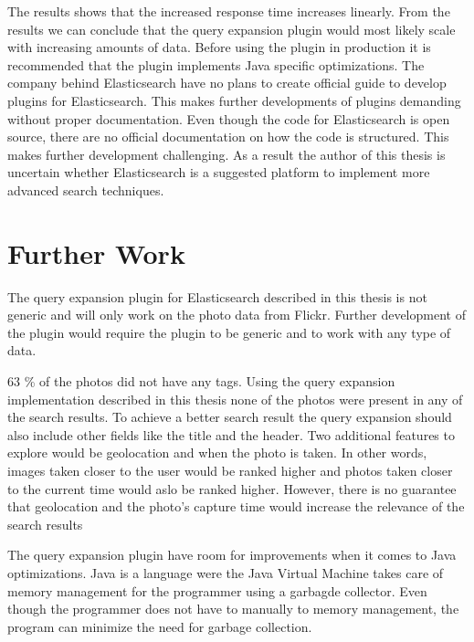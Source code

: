 The results shows that the increased response time increases linearly.
From the results we can conclude that the query expansion plugin would most likely scale with increasing amounts of data.
Before using the plugin in production it is recommended that the plugin implements Java specific optimizations.
The company behind Elasticsearch have no plans to create official guide to develop plugins for Elasticsearch.
This makes further developments of plugins demanding without proper documentation.
Even though the code for Elasticsearch is open source,
there are no official documentation on how the code is structured.
This makes further development challenging.
As a result the author of this thesis is uncertain whether Elasticsearch is a suggested platform to implement more advanced search techniques.

\section{Further Work}
The query expansion plugin for Elasticsearch described in this thesis is not generic and will only work on the photo data from Flickr.
Further development of the plugin would require the plugin to be generic and to work with any type of data.

63 \% of the photos did not have any tags.
Using the query expansion implementation described in this thesis none of the photos were present in any of the search results.
To achieve a better search result the query expansion should also include other fields like the title and the header.
Two additional features to explore would be geolocation and when the photo is taken.
In other words,
images taken closer to the user would be ranked higher and photos taken closer to the current time would aslo be ranked higher.
However, there is no guarantee that geolocation and the photo's capture time would increase the relevance of the search results

The query expansion plugin have room for improvements when it comes to Java optimizations.
Java is a language were the Java Virtual Machine takes care of memory management for the programmer using a garbagde collector.
Even though the programmer does not have to manually to memory management,
the program can minimize the need for garbage collection.





